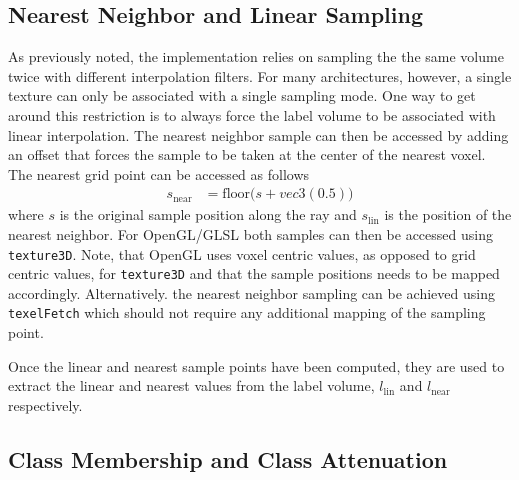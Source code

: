 \documentclass{egpubl}
\begin{document}
\subsection*{Nearest Neighbor and Linear Sampling}

As previously noted, the implementation relies on sampling the the same volume twice with different interpolation filters. For many architectures, however, a single texture can only be associated with a single sampling mode. One way to get around this restriction is to always force the label volume to be associated with linear interpolation. The nearest neighbor sample can then be accessed by adding an offset that forces the sample to be taken at the center of the nearest voxel. The nearest grid point can be accessed as follows
\begin{align}
s_\mathrm{near} &= \mathrm{floor}\big(s + vec3(0.5)\big) \label{eq:near}  
\end{align}
where $s$ is the original sample position along the ray and $s_\mathrm{lin}$ is the position of the nearest neighbor. For OpenGL/GLSL both samples can then be accessed using \texttt{texture3D}. Note, that OpenGL uses voxel centric values, as opposed to grid centric values, for \texttt{texture3D} and that the sample positions needs to be mapped accordingly.
 Alternatively. the nearest neighbor sampling can be achieved using \texttt{texelFetch} which should not require any additional mapping of the sampling point.

Once the linear and nearest sample points have been computed, they are used to extract the linear and nearest values from the label volume, $l_\mathrm{lin}$ and $l_\mathrm{near}$ respectively.

\subsection*{Class Membership and Class Attenuation}
\end{document}
